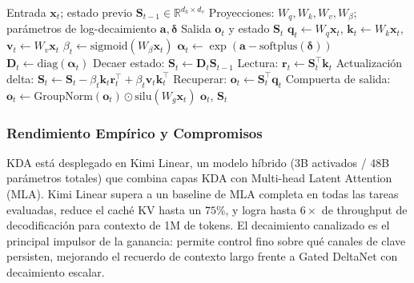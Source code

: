 \begin{algorithm}[H]
\caption{Avance Recurrente de Kimi Delta Attention (Forma de Referencia)}
\begin{algorithmic}[1]
\Require Entrada $\mathbf{x}_t$; estado previo $\mathbf{S}_{t-1} \in \mathbb{R}^{d_k \times d_v}$
\Require Proyecciones: $W_q, W_k, W_v, W_\beta$; parámetros de log-decaimiento $\mathbf{a}, \boldsymbol{\delta}$
\Ensure Salida $\mathbf{o}_t$ y estado $\mathbf{S}_t$
\State $\mathbf{q}_t \gets W_q \mathbf{x}_t$, $\mathbf{k}_t \gets W_k \mathbf{x}_t$, $\mathbf{v}_t \gets W_v \mathbf{x}_t$
\State $\beta_t \gets \mathrm{sigmoid}(W_\beta \mathbf{x}_t)$ 
\State $\boldsymbol{\alpha}_t \gets \exp(\mathbf{a} - \mathrm{softplus}(\boldsymbol{\delta}))$ 
\State $\mathbf{D}_t \gets \mathrm{diag}(\boldsymbol{\alpha}_t)$ 
\State Decaer estado: $\mathbf{S}_t \gets \mathbf{D}_t \mathbf{S}_{t-1}$
\State Lectura: $\mathbf{r}_t \gets \mathbf{S}_t^\top \mathbf{k}_t$ 
\State Actualización delta: $\mathbf{S}_t \gets \mathbf{S}_t - \beta_t \mathbf{k}_t \mathbf{r}_t^\top + \beta_t \mathbf{v}_t \mathbf{k}_t^\top$
\State Recuperar: $\mathbf{o}_t \gets \mathbf{S}_t^\top \mathbf{q}_t$
\State Compuerta de salida: $\mathbf{o}_t \gets \mathrm{GroupNorm}(\mathbf{o}_t) \odot \mathrm{silu}(W_g \mathbf{x}_t)$
\State \Return $\mathbf{o}_t$, $\mathbf{S}_t$
\end{algorithmic}
\end{algorithm}

\subsubsection{Rendimiento Empírico y Compromisos}

KDA está desplegado en Kimi Linear, un modelo híbrido (3B activados / 48B parámetros totales) que combina capas KDA con Multi-head Latent Attention (MLA). Kimi Linear supera a un baseline de MLA completa en todas las tareas evaluadas, reduce el caché KV hasta un $75\%$, y logra hasta $6\times$ de throughput de decodificación para contexto de 1M de tokens. El decaimiento canalizado es el principal impulsor de la ganancia: permite control fino sobre qué canales de clave persisten, mejorando el recuerdo de contexto largo frente a Gated DeltaNet con decaimiento escalar.

